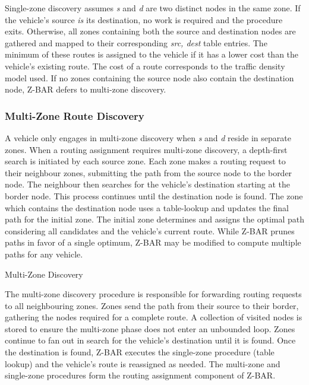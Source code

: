 \documentclass[conference]{IEEEtran}
\begin{document}
Single-zone discovery assumes \textit{s} and \textit{d} are two distinct nodes in the same zone. If the vehicle's source \textit{is} its destination, no work is required and the procedure exits. Otherwise, all zones containing both the source and destination nodes are gathered and mapped to their corresponding \textit{src, dest} table entries. The minimum of these routes is assigned to the vehicle if it has a lower cost than the vehicle's existing route. The cost of a route corresponds to the traffic density model used. If no zones containing the source node also contain the destination node, Z-BAR defers to multi-zone discovery.

\subsubsection{Multi-Zone Route Discovery}

A vehicle only engages in multi-zone discovery when \textit{s} and \textit{d} reside in separate zones. When a routing assignment requires multi-zone discovery, a depth-first search is initiated by each source zone. Each zone makes a routing request to their neighbour zones, submitting the path from the source node to the border node. The neighbour then searches for the vehicle's destination starting at the border node. This process continues until the destination node is found. The zone which contains the destination node uses a table-lookup and updates the final path for the initial zone. The initial zone determines and assigns the optimal path considering all candidates and the vehicle's current route. While Z-BAR prunes paths in favor of a single optimum, Z-BAR may be modified to compute multiple paths for any vehicle.

\begin{algorithm}[H]
  \caption{Multi-Zone Discovery}
  \label{route_discovery_multi_zone}
  \begin{algorithmic}[1]
      \EndIf
    \EndFor
  \EndFor
  \EndProcedure
  \end{algorithmic}
\end{algorithm}

The multi-zone discovery procedure is responsible for forwarding routing requests to all neighbouring zones. Zones send the path from their source to their border, gathering the nodes required for a complete route. A collection of visited nodes is stored to ensure the multi-zone phase does not enter an unbounded loop. Zones continue to fan out in search for the vehicle's destination until it is found. Once the destination is found, Z-BAR executes the single-zone procedure (table lookup) and the vehicle's route is reassigned as needed. The multi-zone and single-zone procedures form the routing assignment component of Z-BAR.
\end{document}
